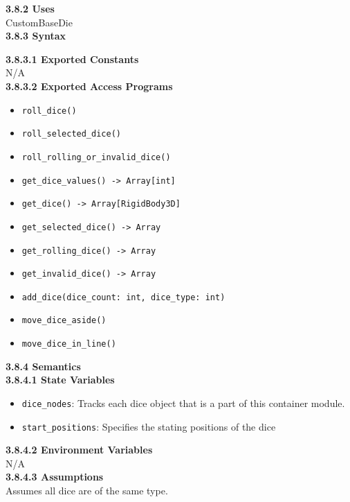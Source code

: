 \documentclass[12pt, titlepage]{article}
\begin{document}
\noindent \textbf{3.8.2 Uses}\\
CustomBaseDie \\

\noindent \textbf{3.8.3 Syntax}

\noindent \textbf{3.8.3.1 Exported Constants}\\
N/A\\

\textbf{3.8.3.2 Exported Access Programs}
\begin{itemize}
	\item \texttt{roll\_dice() }
	\item \texttt{roll\_selected\_dice() }
	\item \texttt{roll\_rolling\_or\_invalid\_dice() }
	\item \texttt{get\_dice\_values() -> Array[int] }
	\item \texttt{get\_dice() -> Array[RigidBody3D]  }
	\item \texttt{get\_selected\_dice() -> Array }
	\item \texttt{get\_rolling\_dice() -> Array }
	\item \texttt{get\_invalid\_dice() -> Array  }
	\item \texttt{add\_dice(dice\_count: int, dice\_type: int)}
	\item \texttt{move\_dice\_aside() }
	\item \texttt{move\_dice\_in\_line() }
	
\end{itemize}

\noindent \textbf{3.8.4 Semantics}\\
\textbf{3.8.4.1 State Variables}\\
\begin{itemize}
	\item \texttt{dice\_nodes}: Tracks each dice object that is a part of this container module.
	\item \texttt{start\_positions}: Specifies the stating positions of the dice

\end{itemize}

\textbf{3.8.4.2 Environment Variables}\\

N/A\\

\textbf{3.8.4.3 Assumptions}\\
Assumes all dice are of the same type.
\end{document}

